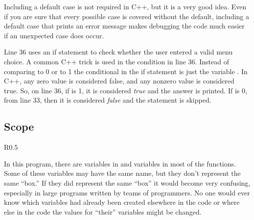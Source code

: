 Including a default case is not required in C++, but it is a very good idea.  Even if you are sure that every possible case is covered without the default, including a default case that prints an error message makes debugging the code much easier if an unexpected case does occur.


Line 36 uses an if statement to check whether the user entered a valid menu choice.  A common C++ trick is used in the condition in line 36.  Instead of comparing  to 0 or to 1 the conditional in the if statement  is just the variable .  In C++, any zero value is considered false, and any nonzero value is considered true.  So, on line 36, if  is 1, it is considered \emph{true} and the answer is printed.  If  is 0, from line 33, then it is considered \emph{false} and the  statement is skipped.

\subsection{Scope}

\begin{wrapfigure}{R}{0.5\textwidth} 
\vspace{-0.5cm}
\end{wrapfigure}

In this program, there are variables in  and variables in most of the functions.  Some of these variables may have the same name, but they don't represent the same ``box.''  If they did represent the same ``box'' it would become very confusing, especially in  large programs written by teams of programmers.  No one would ever know which variables had already been created elsewhere in the code or where else in the code the values for ``their'' variables might be changed.

